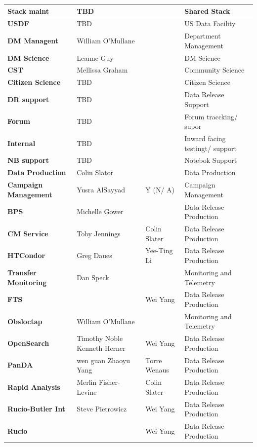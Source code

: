 \begin{longtable} {
|p{}   |p{}|p{} |p{}|}
{\textbf{Stack maint}} & TBD &  & Shared Stack \\ \hline
{\textbf{USDF}} & TBD &  & US Data Facility \\ \hline
{\textbf{DM Managent}} & William O'Mullane &  & Department Management \\ \hline
{\textbf{DM Science}} & Leanne Guy &  & DM Science \\ \hline
{\textbf{CST}} & Mellissa Graham &  & Community Science \\ \hline
{\textbf{Citizen Science}} & TBD &  & Citizen Science \\ \hline
{\textbf{DR support}} & TBD &  & Data Release Support \\ \hline
{\textbf{Forum}} & TBD &  & Forum traccking/ supor \\ \hline
{\textbf{Internal}} & TBD &  & Inward facing testingt/ support \\ \hline
{\textbf{NB support}} & TBD &  & Notebok Support \\ \hline
{\textbf{Data Production}} & Colin Slator &  & Data Production \\ \hline
{\textbf{Campaign Management}} & Yusra AlSayyad & Y (N/ A) & Campaign Management \\ \hline
{\textbf{BPS}} & Michelle Gower &  & Data Release Production \\ \hline
{\textbf{CM Service}} & Toby Jennings & Colin Slater & Data Release Production \\ \hline
{\textbf{HTCondor}} & Greg Daues & Yee-Ting Li & Data Release Production \\ \hline
{\textbf{Transfer Monitoring}} & Dan Speck &  & Monitoring and Telemetry \\ \hline
{\textbf{FTS}} &  & Wei Yang & Data Release Production \\ \hline
{\textbf{Obsloctap}} & William O'Mullane &  & Monitoring and Telemetry \\ \hline
{\textbf{OpenSearch}} & Timothy Noble
 Kenneth Herner & Wei Yang & Data Release Production \\ \hline
{\textbf{PanDA}} & wen guan
 Zhaoyu Yang & Torre Wenaus & Data Release Production \\ \hline
{\textbf{Rapid Analysis}} & Merlin Fisher-Levine & Colin Slater & Data Release Production \\ \hline
{\textbf{Rucio-Butler Int}} & Steve Pietrowicz & Wei Yang & Data Release Production \\ \hline
{\textbf{Rucio}} &  & Wei Yang & Data Release Production \\ \hline

\end{longtable}
